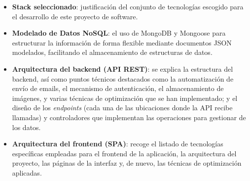 \begin{itemize}
    \item \textbf{Stack seleccionado}: justificación del conjunto de tecnologías escogido para el desarrollo de este proyecto de software.
    \item \textbf{Modelado de Datos NoSQL}: el uso de MongoDB y Mongoose para estructurar la información de forma flexible mediante documentos JSON modelados, facilitando el almacenamiento de estructuras de datos.

    \item \textbf{Arquitectura del backend (API REST)}: se explica la estructura del backend, así como puntos técnicos destacados como la automatización de envío de emails, el mecanismo de autenticación, el almacenamiento de imágenes, y varias técnicas de optimización que se han implementado; y el diseño de los \textit{endpoints} (cada una de las ubicaciones donde la API recibe llamadas) y controladores que implementan las operaciones para gestionar de los datos.

    \item \textbf{Arquitectura del frontend (SPA)}: recoge el listado de tecnologías específicas empleadas para el frontend de la aplicación, la arquitectura del proyecto, las páginas de la interfaz y, de nuevo, las técnicas de optimización aplicadas.
\end{itemize}




